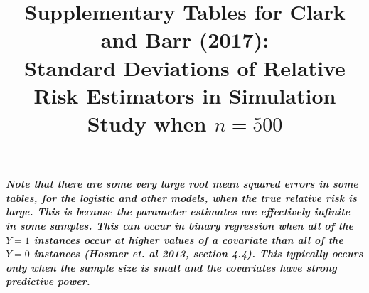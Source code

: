 \documentclass[12pt,a4paper]{article}
\date{}
\begin{document}
\title{Supplementary Tables for Clark and Barr (2017):  \\  
Standard Deviations of Relative Risk Estimators in Simulation Study when $n=500$ }


\maketitle



{\bf \it Note that there are some very large root mean squared errors in some tables, for the logistic and other models, when the true relative risk is large. This is because the parameter estimates are effectively infinite in some samples. This can occur in binary regression when all of the $Y=1$ instances occur at higher values of a covariate than all of the $Y=0$ instances (Hosmer et. al 2013, section 4.4). This typically occurs only when the sample size is small and the covariates have strong predictive power.}
\end{document}
